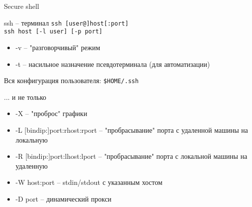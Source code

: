 \begin{frame}{Secure shell}

	\begin{block}{ssh -- терминал}
		{\tt ssh [user@]host[:port]}\\
		{\tt ssh host [-l user] [-p port]}
		\begin{itemize}
			\item -v -- "разговорчивый" режим 
			\item -t -- насильное назначение псевдотерминала (для автоматизации)
		\end{itemize}
		Вся конфигурация пользователя: {\tt \$HOME/.ssh}
	\end{block}

	\pause

	\begin{block}{... и не только}
		\begin{itemize}
			\item -X -- "проброс" графики 
			\item -L [bindip:]port:rhost:rport -- "пробрасывание" порта с удаленной машины на локальную
			\item -R [bindip:]port:lhost:lport -- "пробрасывание" порта с локальной машины на удаленную
			\item -W host:port -- stdin/stdout с указанным хостом
			\item -D port -- динамический прокси
		\end{itemize}
	\end{block}
\end{frame}


